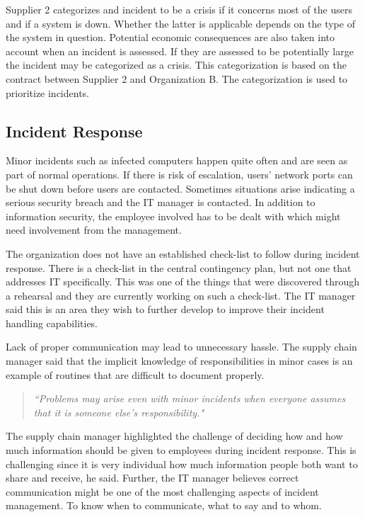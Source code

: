 Supplier 2 categorizes and incident to be a crisis if it concerns most of the users and if a system is down. Whether the latter is applicable depends on the type of the system in question. Potential economic consequences are also taken into account when an incident is assessed. If they are assessed to be potentially large the incident may be categorized as a crisis. This categorization is based on the contract between Supplier 2 and Organization B. The categorization is used to prioritize incidents.

\subsection{Incident Response}
Minor incidents such as infected computers happen quite often and are seen as part of normal operations. If there is risk of escalation, users' network ports can be shut down before users are contacted. Sometimes situations arise indicating a serious security breach and the IT manager is contacted. In addition to information security, the employee involved has to be dealt with which might need involvement from the management.

The organization does not have an established check-list to follow during incident response. There is a check-list in the central contingency plan, but not one that addresses IT specifically. This was one of the things that were discovered through a rehearsal and they are currently working on such a check-list. The IT manager said this is an area they wish to further develop to improve their incident handling capabilities. 

Lack of proper communication may lead to unnecessary hassle. The supply chain manager said that the implicit knowledge of responsibilities in minor cases is an example of routines that are difficult to document properly.

\begin{quote}
\textit{``Problems may arise even with minor incidents when everyone assumes that it is someone else's responsibility."}
\end{quote}

The supply chain manager highlighted the challenge of deciding how and how much information should be given to employees during incident response. This is challenging since it is very individual how much information people both want to share and receive, he said. Further, the IT manager believes correct communication might be one of the most challenging aspects of incident management. To know when to communicate, what to say and to whom. 


